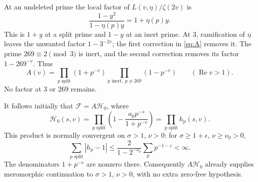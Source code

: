 \documentclass[11pt]{article}
\numberwithin{equation}{section}
\newcommand{\F}{\mathcal F}
\newcommand{\HH}{\mathcal H}
\newcommand{\Rea}{\operatorname{Re}}
\begin{document}
At an undeleted prime the local factor of $L(v,\eta)/\zeta(2v)$ is
\begin{equation}
 \frac{1-y^2}{1-\eta(p)y}=1+\eta(p)y.
\end{equation}
This is $1+y$ at a split prime and $1-y$ at an inert prime.
At $3$, ramification of $\eta$ leaves the unwanted factor
$1-3^{-2v}$; the first correction in \eqref{eq:A} removes it.
The prime $269\equiv2\pmod3$ is inert, and the second correction
removes its factor $1-269^{-v}$. Thus
\begin{equation}\label{eq:Aproduct}
 A(v)=\prod_{p\text{ split}}(1+p^{-v})
       \prod_{p\text{ inert},\ p\ne269}(1-p^{-v})
       \qquad(\Rea v>1).
\end{equation}
No factor at $3$ or $269$ remains.

It follows initially that $\F=A\HH_0$, where
\begin{equation}\label{eq:H0}
 \HH_0(s,v)=\prod_{p\text{ split}}
       \left(1-\frac{a_pp^{-s}}{1+p^{-v}}\right)
       =\prod_{p\text{ split}}h_p(s,v).
\end{equation}
This product is normally convergent on $\sigma>1$, $\nu>0$:
for $\sigma\ge1+\epsilon$, $\nu\ge\nu_0>0$,
\begin{equation}\label{eq:Hbound}
 \sum_{p\text{ split}}|h_p-1|
 \le\frac{2}{1-2^{-\nu_0}}\sum_p p^{-1-\epsilon}<\infty.
\end{equation}
The denominators $1+p^{-v}$ are nonzero there.
Consequently $A\HH_0$ already supplies meromorphic continuation
to $\sigma>1$, $\nu>0$, with no extra zero-free hypothesis.
\end{document}
